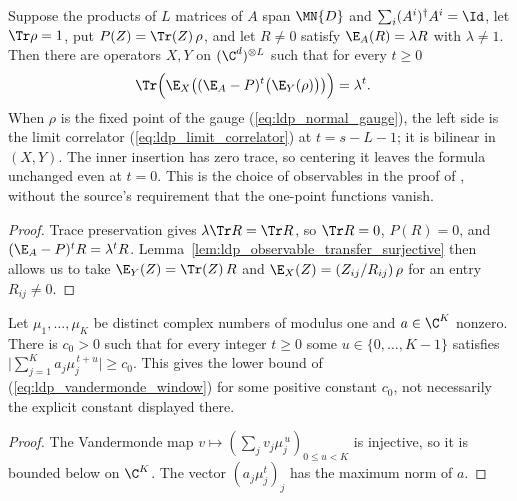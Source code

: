 \begin{lemma}
    \label{lem:ldp_limit_correlator_eigenvalue}
    \leanok
    Suppose the products of $L$ matrices of $A$ span $\MN{D}$ and
    $\sum_i(A^i)^\dagger A^i=\Id$, let $\Tr\rho=1$, put $P(Z)=\Tr(Z)\,\rho$,
    and let $R\neq0$ satisfy $\E_A(R)=\lambda R$ with $\lambda\neq1$. Then there
    are operators $X,Y$ on $(\C^d)^{\otimes L}$ such that for every $t\ge0$
    \begin{align}
        \Tr\Bigl(\E_X\bigl((\E_A-P)^t\bigl(\E_Y(\rho)\bigr)\bigr)\Bigr)
         & =\lambda^t.
        \notag
    \end{align}
    When $\rho$ is the fixed point of the gauge (\ref{eq:ldp_normal_gauge}),
    the left side is the limit correlator (\ref{eq:ldp_limit_correlator}) at
    $t=s-L-1$; it is bilinear in $(X,Y)$. The inner insertion has zero
    trace, so centering it leaves the formula unchanged even at $t=0$. This is the choice of observables in
    the proof of \cite[Lemma~2]{Malz2024Preparation}, without the source's
    requirement that the one-point functions vanish.
\end{lemma}
\begin{proof}
    \leanok
    Trace preservation gives $\lambda\Tr R=\Tr R$, so $\Tr R=0$, $P(R)=0$, and
    $(\E_A-P)^tR=\lambda^tR$.
    Lemma~\ref{lem:ldp_observable_transfer_surjective} then allows us to take
    $\E_Y(Z)=\Tr(Z)\,R$ and $\E_X(Z)=(Z_{ij}/R_{ij})\,\rho$ for an entry
    $R_{ij}\neq0$.
\end{proof}

\begin{lemma}
    \label{lem:ldp_vandermonde_window}
    \leanok
    Let $\mu_1,\dots,\mu_K$ be distinct complex numbers of modulus one and
    $a\in\C^K$ nonzero. There is $c_0>0$ such that for every integer $t\ge0$
    some $u\in\{0,\dots,K-1\}$ satisfies
    $\bigl\lvert\sum_{j=1}^Ka_j\mu_j^{\,t+u}\bigr\rvert\ge c_0$. This gives
    the lower bound of (\ref{eq:ldp_vandermonde_window}) for some positive
    constant $c_0$, not necessarily the explicit constant displayed there.
\end{lemma}
\begin{proof}
    \leanok
    The Vandermonde map $v\mapsto(\sum_jv_j\mu_j^{\,u})_{0\le u<K}$ is
    injective, so it is bounded below on $\C^K$. The vector
    $(a_j\mu_j^t)_j$ has the maximum norm of $a$.
\end{proof}

